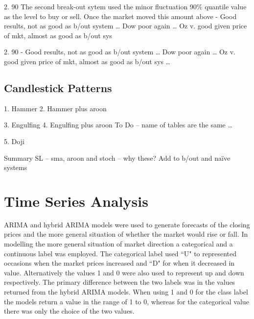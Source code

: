 

2.	90%
The second break-out sytem used the minor fluctuation 90\% quantile value as the level to buy or sell. Once the market moved this amount above
-	Good results, not as good as b/out system … Dow poor again … Oz v. good given price of mkt, almost as good as b/out sys 

2.	90%
-	Good results, not as good as b/out system … Dow poor again … Oz v. good given price of mkt, almost as good as b/out sys …

\subsection{Candlestick Patterns}
1.	Hammer
2.	Hammer plus aroon

3.	Engulfing
4.	Engulfing plus aroon
To Do – name of tables are the same …

5.	Doji


Summary
SL – sma, aroon and stoch – why these?  Add to b/out and naïve systems



\section{Time Series Analysis}
ARIMA and hybrid ARIMA models were used to generate forecasts of the closing prices and the more general situation of whether the market would rise or fall. In modelling the more general situation of market direction a categorical and a continuous label was employed. The categorical label used \textquotedblleft U" to represented occasions when the market prices increased and \textquotedblleft D" for when it decreased in value. Alternatively the values 1 and 0 were also used to represent up and down respectively. The primary difference between the two labels was in the values returned from the hybrid ARIMA models. When using 1 and 0 for the class label the models return a value in the range of 1 to 0, whereas for the categorical value there was only the choice of the two values. 

